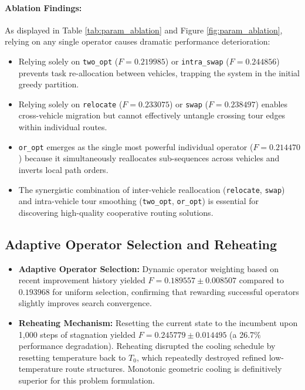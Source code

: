 \paragraph{Ablation Findings:}
As displayed in Table \ref{tab:param_ablation} and Figure \ref{fig:param_ablation}, relying on any single operator causes dramatic performance deterioration:
\begin{itemize}
    \item Relying solely on \texttt{two\_opt} ($F = 0.219985$) or \texttt{intra\_swap} ($F = 0.244856$) prevents task re-allocation between vehicles, trapping the system in the initial greedy partition.
    \item Relying solely on \texttt{relocate} ($F = 0.233075$) or \texttt{swap} ($F = 0.238497$) enables cross-vehicle migration but cannot effectively untangle crossing tour edges within individual routes.
    \item \texttt{or\_opt} emerges as the single most powerful individual operator ($F = 0.214470$) because it simultaneously reallocates sub-sequences across vehicles and inverts local path orders.
    \item The synergistic combination of inter-vehicle reallocation (\texttt{relocate}, \texttt{swap}) and intra-vehicle tour smoothing (\texttt{two\_opt}, \texttt{or\_opt}) is essential for discovering high-quality cooperative routing solutions.
\end{itemize}

\subsection{Adaptive Operator Selection and Reheating}
\begin{itemize}
    \item \textbf{Adaptive Operator Selection:} Dynamic operator weighting based on recent improvement history yielded $F = 0.189557 \pm 0.008507$ compared to $0.193968$ for uniform selection, confirming that rewarding successful operators slightly improves search convergence.
    \item \textbf{Reheating Mechanism:} Resetting the current state to the incumbent upon 1,000 steps of stagnation yielded $F = 0.245779 \pm 0.014495$ (a 26.7\% performance degradation). Reheating disrupted the cooling schedule by resetting temperature back to $T_0$, which repeatedly destroyed refined low-temperature route structures. Monotonic geometric cooling is definitively superior for this problem formulation.
\end{itemize}

